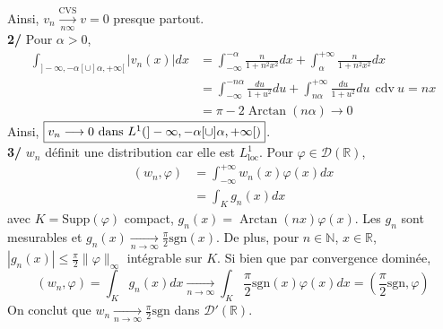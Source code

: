 \documentclass[a4paper,12pt]{article}
\begin{document}
Ainsi, $\boxed{v_n \xrightarrow[n \infty]{\text{CVS}} v = 0}$ presque partout. \\

\textbf{2/} Pour $\alpha > 0$,
\begin{align*}
     \int_{]- \infty, - \alpha[ \cup ]\alpha, + \infty[} |v_n(x)|dx & = \int_{- \infty}^{- \alpha} \frac{n}{1+n^2 x^2} dx + \int_{\alpha}^{+ \infty} \frac{n}{1+n^2 x^2} dx \\
     & =  \int_{- \infty}^{-n \alpha} \frac{du}{1+u^2} du + \int_{n \alpha}^{+ \infty} \frac{du}{1+u^2} du \ \ \text{cdv} \ u=nx \\ 
     & \boxed{= \pi -2 \operatorname{Arctan}(n \alpha) \longrightarrow 0}
\end{align*}
Ainsi, $\boxed{v_n \longrightarrow 0$ dans $L^1(]- \infty, - \alpha[ \cup ]\alpha, + \infty[)}$. \\

\textbf{3/} $w_n$ définit une distribution car elle est $L^1_{\text{loc}}$. Pour $\varphi \in \mathcal{D}(\mathbb{R})$,
\begin{align*}
    (w_n, \varphi) & = \int_{- \infty}^{+ \infty} w_n(x) \varphi(x) dx \\ 
    			& = \int_K g_n(x) dx
\end{align*}
avec $K= \text{Supp}(\varphi)$ compact, $g_n(x) = \operatorname{Arctan}(nx) \varphi(x)$. Les $g_n$ sont mesurables et $g_n(x)\underset{n \to \infty}{\longrightarrow} \frac{\pi}{2} \text{sgn}(x)$. De plus, pour $n \in \mathbb{N}$, $x \in \mathbb{R}$, $|g_n(x)| \leq \frac{\pi}{2} \|\varphi\|_{\infty}$ intégrable sur $K$. Si bien que par convergence dominée, 
$$\boxed{(w_n, \varphi)=\int_{K} g_n(x)dx \underset{n \to \infty}{\longrightarrow} \int_K \frac{\pi}{2} \text{sgn}(x) \varphi(x) dx = (\frac{\pi}{2} \text{sgn}, \varphi)}$$
On conclut que $\boxed{w_n \underset{n \to \infty}{\longrightarrow} \frac{\pi}{2} \text{sgn}}$ dans $\mathcal{D}'(\mathbb{R})$. \\
\end{document}
